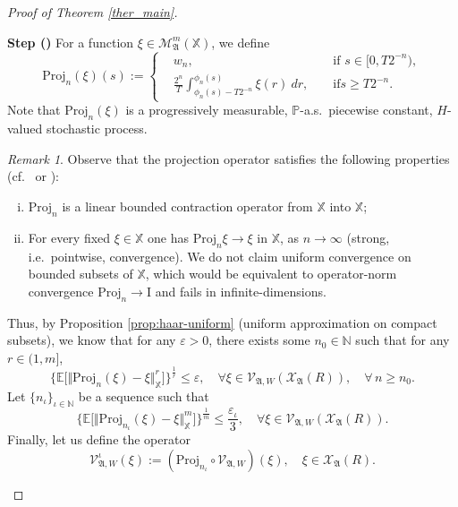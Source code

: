 \documentclass[english,a4paper,11pt]{amsart}
\theoremstyle{plain}
\theoremstyle{definition}
\theoremstyle{remark}
\newtheorem{remark}[theorem]{Remark}
\numberwithin{equation}{section}
\newcounter{lil1}
\newenvironment{step}
{\begin{list} { \bf Step (\Roman{lil1})}
		{ \usecounter{lil1}
			\setlength{\leftmargin}{0.0cm}
			\setlength{\topsep}{0.2cm}
			\setlength{\itemsep}{0.0cm}
			\setlength{\parsep}{0.1cm}
			\setlength{\itemindent}{0.8cm}
			\setlength{\parskip}{0.0cm}}}
	{\end{list}}
\newcounter{lil33}
\newcounter{lil1q}
\newcommand{\ep} {\varepsilon }
\newcommand{\NN}{\mathbb{N}}
\newcommand{\EE}{ \mathbb{E} }
\newcommand{\Mcal} {{\mathcal M}}
\newcommand{\Afrak} {{\mathfrak A}}
\renewcommand{\P}{\mathbb{P}}
\newcommand{\X}{\mathbb{X}}
\newcommand{\Pro}{Pro}
\begin{document}
\begin{proof}[Proof of Theorem \ref{ther_main}]
\begin{step}
For a function $\xi\in\Mcal_{\Afrak}^{m}(\X)$, we define
\renewcommand{\Pro}{\mbox{Proj}}
\begin{equation*}
	 \Pro_n(\xi)(s):=\left\{
	 \begin{aligned}
	 	 &w_n, 
&&\mbox{ if } s\in [0,T2^{-n}),
\\
&\frac{2^n}{T}\int_{\phi_n(s)-T2^{-n}}^{\phi_n(s)} \xi(r)\: dr, &&\mbox{ if
} s\geq T2^{-n}.
	 \end{aligned}
\right.
\end{equation*}
Note that $\Pro_n(\xi)$ is a
progressively measurable, $\P$-a.s.~piecewise constant, $H$-valued stochastic process.
\begin{remark}\label{projection}
Observe that the projection operator satisfies the following properties (cf.~\cite[Appendix B]{BHM} or \cite[Appendix B]{FKEHMH}):
\begin{enumerate}[(i)]
	\item\label{PP1} $\Pro_n$ is a linear bounded contraction operator from $\mathbb{X}$ into $\mathbb{X}$;
	\item\label{PP2} {For every fixed $\xi\in \mathbb{X}$ one has $\Pro_n \xi\to \xi$ in $\mathbb{X}$, as
	$n\to\infty$ (strong, i.e.\ pointwise, convergence). We do not claim
	uniform convergence on bounded subsets of $\mathbb{X}$, which would be equivalent to
	operator-norm convergence $\Pro_n\to \mathrm{I}$ and fails in infinite-dimensions.}
\end{enumerate}
\end{remark}

{Thus, by Proposition \ref{prop:haar-uniform} (uniform approximation on compact subsets)},
 we know that for any $\ep>0$, there exists some $n_0\in\NN$ 
 such that for any $r\in (1,m]$,
$$
\Big\{ \EE\Big[\Vert\Pro_n(\xi)-\xi\Vert^r_{\mathbb{X}}\Big]\Big\}^\frac 1r \le  \ep ,\quad \forall \xi\in \mathcal{V}_{\mathfrak{A},W}\left( \mathcal{X}_\mathfrak{A}(R)\right),\quad \forall \, n\ge n_0.
$$
Let $\{n_\iota\}_{\iota\in\NN}$ be a sequence such that
\begin{equation*}
\Big\{ \EE\Big[ \Vert\Pro_{n_\iota}(\xi)-\xi\Vert_{\mathbb{X}}^{m}\Big]\Big\}^\frac{1}{m}\le \frac {\ep_\iota} 3,\quad \forall \xi\in \mathcal{V}_{\mathfrak{A},W}\left( \mathcal{X}_\mathfrak{A}(R)\right).
\end{equation*}
Finally, let us define the operator
$$
\mathcal{V}^\iota _{\mathfrak{A},W}(\xi):=  (\Pro_{n_\iota} \circ\mathcal{V}_{\mathfrak{A},W})(\xi),\quad \xi\in \mathcal{X}_\mathfrak{A}(R).
$$


\end{step}
\end{proof}
\end{document}
